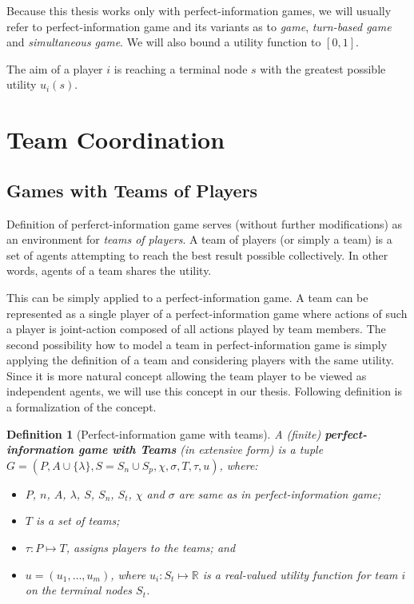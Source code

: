 Because this thesis works only with perfect-information games, we will usually refer to
perfect-information game and its variants as to \emph{game}, \emph{turn-based game} and
\emph{simultaneous game}. We will also bound a utility function to $[0,1]$.

The aim of a player $i$ is reaching a terminal node $s$ with the greatest possible utility
$u_i(s)$.


\section{Team Coordination}

\subsection{Games with Teams of Players}

Definition of perferct-information game serves (without further modifications) as an
environment for \emph{teams of players}. A team of players (or simply a team) is a set of agents
attempting to reach the best result possible collectively. In other words, agents of a team
shares the utility. 

This can be simply applied to a perfect-information game. A team can be represented as a single
player of a perfect-information game where actions of such a player is joint-action composed of
all actions played by team members. The second possibility how to model a team in
perfect-information game is simply applying the definition of a team and considering players
with the same utility. Since it is more natural concept allowing the team player to be viewed as
independent agents, we will use this concept in our thesis. Following definition is a
formalization of the concept.

\newtheorem*{defpigt}{Definition}
\begin{defpigt}[Perfect-information game with teams]

A (finite) \textbf{perfect-information game with Teams} (in extensive form) is a tuple $G =
(P,A\cup\{\lambda\}, S=S_n\cup S_p, \chi, \sigma, T, \tau, u)$, where:


\begin{itemize}

\item $P$, $n$, $A$, $\lambda$, $S$, $S_n$, $S_t$, $\chi$ and $\sigma$ are same as in
perfect-information game;

\item $T$ is a set of teams;

\item $\tau: P \mapsto T$, assigns players to the teams; and

\item $u = (u_1,\ldots,u_m)$, where $u_i: S_t \mapsto \mathbb{R}$ is a real-valued utility
function for team $i$ on the terminal nodes $S_t$.


\end{itemize}

\end{defpigt}


